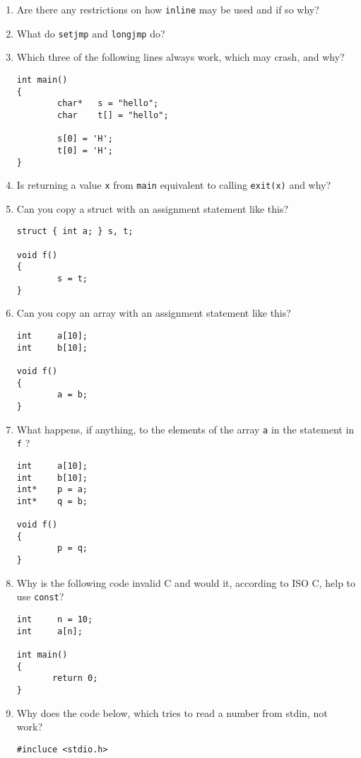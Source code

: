 \documentclass{article}
\begin{document}
\begin{enumerate}
\item Are there any restrictions on how \verb.inline. may be used and if so why?
\item What do {\tt setjmp} and {\tt longjmp} do?

\item Which three of the following lines always work, which may crash, and why?
\begin{verbatim}
int main()
{
        char*   s = "hello"; 
        char    t[] = "hello"; 

        s[0] = 'H';
        t[0] = 'H';
}
\end{verbatim}

\item Is returning a value {\tt x} from {\tt main} equivalent to calling {\tt exit(x)} and why?

\item Can you copy a struct with an assignment statement like this?
\begin{verbatim}
struct { int a; } s, t;

void f()
{
        s = t;
}
\end{verbatim}
\item Can you copy an array with an assignment statement like this?
\begin{verbatim}
int     a[10];
int     b[10];

void f()
{
        a = b;
}
\end{verbatim}


\item What happens, if anything, to the elements of the array {\tt a} in the statement in {\tt f} ?
\begin{verbatim}
int     a[10];
int     b[10];
int*    p = a;
int*    q = b;

void f()
{
        p = q;
}
\end{verbatim}

\item Why is the following code invalid C and would it, according to ISO C, help to use {\tt const}?
\begin{verbatim}
int     n = 10;
int     a[n];

int main()
{
       return 0;       
}
\end{verbatim}

\newpage
\item Why does the code below, which tries to read a number from stdin, not work?
\begin{verbatim}
#incluce <stdio.h>


\end{verbatim}
\end{enumerate}
\end{document}
